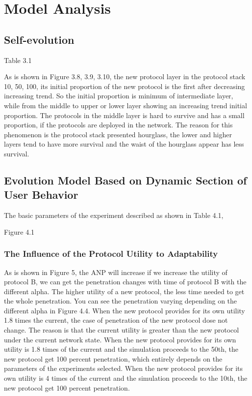 \documentclass{article}
\begin{document}
\section{Model Analysis}
\subsection{Self-evolution}
Table 3.1

As is shown in Figure 3.8, 3.9, 3.10, the new protocol layer in the protocol stack 10, 50, 100, its initial proportion of the new
protocol is the first after decreasing increasing trend. So the initial proportion is minimum of intermediate layer, while from
the middle to upper or lower layer showing an increasing trend initial proportion. The protocols in the middle layer is hard to
survive and has a small proportion, if the protocols are deployed in the network. The reason for this phenomenon is the
protocol stack presented hourglass, the lower and higher layers tend to have more survival and the waist of the hourglass appear has less survival.

\subsection{Evolution Model Based on Dynamic Section of User Behavior}
The basic parameters of the experiment described as shown in Table 4.1,

Figure 4.1

\subsubsection{The Influence of the Protocol Utility to Adaptability}
As is shown in Figure 5, the ANP will increase if we increase the utility of protocol B, we can get the penetration
changes with time of protocol B with the different alpha. The higher utility of a new protocol, the less time needed to get
the whole penetration. You can see the penetration varying depending on the different alpha in Figure 4.4. When the new
protocol provides for its own utility 1.8 times the current, the case of penetration of the new protocol dose not change.
The reason is that the current utility is greater than the new protocol under the current network state. When the new
protocol provides for its own utility is 1.8 times of the current and the simulation proceeds to the 50th,  the new protocol
get 100 percent penetration, which entirely depends on the parameters of the experiments selected. When the new protocol
provides for its own utility is 4 times of the current and the simulation proceeds to the 10th, the new protocol get 100 percent penetration.
\end{document}
